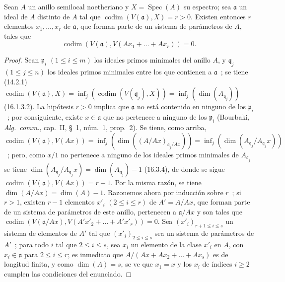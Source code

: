 
\begin{proposition}[16.3.8]
\label{0.16.3.8-fr}
Sean $A$ un anillo semilocal noetheriano y $X=\operatorname{Spec}(A)$ su
espectro; sea $\mathfrak{a}$ un ideal de $A$ distinto de $A$ tal que
$\operatorname{codim}(V(\mathfrak{a}),X)=r>0$. Existen entonces $r$ elementos
$x_1,\ldots,x_r$ de $\mathfrak{a}$, que forman parte de un sistema de parámetros
de $A$, tales que
\[
  \operatorname{codim}(V(\mathfrak{a}),
  V(Ax_1+\ldots+Ax_r))=0.
\]
\end{proposition}

\begin{proof}
Sean $\mathfrak{p}_i$ $(1\leq i\leq m)$ los ideales primos minimales del
anillo $A$, y $\mathfrak{q}_j$ $(1\leq j\leq n)$ los ideales primos minimales
entre los que contienen a $\mathfrak{a}$~; se tiene (14.2.1)
$\operatorname{codim}(V(\mathfrak{a}),X)=\inf_j(\operatorname{codim}(V(\mathfrak{q}_j),X))=\inf_j(\dim(A_{\mathfrak{q}_j}))$
(16.1.3.2). La hipótesis $r>0$ implica que $\mathfrak{a}$ no está contenido en
ninguno de los $\mathfrak{p}_i$~; por consiguiente, existe
$x\in\mathfrak{a}$ que no pertenece a ninguno de los $\mathfrak{p}_i$
(Bourbaki, \emph{Alg.~comm.}, cap.~II, \S~1, núm.~1, prop.~2). Se tiene, como
arriba,
$\operatorname{codim}(V(\mathfrak{a}),V(Ax))=\inf_j(\dim((A/Ax)_{\mathfrak{q}_j/Ax}))=\inf_j(\dim(A_{\mathfrak{q}_j}/A_{\mathfrak{q}_j}x))$~;
pero, como $x/1$ no pertenece a ninguno de los ideales primos minimales
de $A_{\mathfrak{q}_j}$ se tiene
$\dim(A_{\mathfrak{q}_j}/A_{\mathfrak{q}_j}x)
=\dim(A_{\mathfrak{q}_j})-1$ (16.3.4), de donde se sigue
$\operatorname{codim}(V(\mathfrak{a}),V(Ax))=r-1$. Por la misma razón, se tiene
$\dim(A/Ax)=\dim(A)-1$. Razonemos ahora por inducción sobre $r$~; si
$r>1$, existen $r-1$ elementos $x'_i$ $(2\leq i\leq r)$ de $A'=A/Ax$,
que forman parte de un sistema de parámetros de este anillo, pertenecen a
$\mathfrak{a}/Ax$ y son tales que
$\operatorname{codim}(V(\mathfrak{a}/Ax),V(A'x'_2+\ldots+A'x'_r))=0$.
Sea $(x'_i)_{r+1\leq i\leq s}$ un sistema de elementos de $A'$ tal que
$(x'_i)_{2\leq i\leq s}$ sea un sistema de parámetros de $A'$~; para todo
$i$ tal que $2\leq i\leq s$, sea $x_i$ un elemento de la clase $x'_i$ en
$A$, con $x_i\in\mathfrak{a}$ para $2\leq i\leq r$; es inmediato que
$A/(Ax+Ax_2+\ldots+Ax_s)$ es de longitud finita, y como $\dim(A)=s$, se ve
que $x_1=x$ y los $x_i$ de índices $i\geq2$ cumplen las condiciones del
enunciado.
\end{proof}

